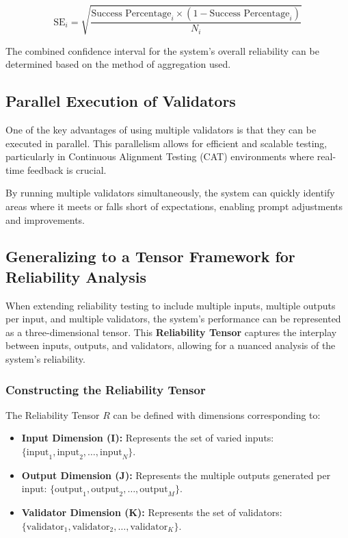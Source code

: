 \documentclass{article}
\begin{document}
\begin{equation*}
\text{SE}_i = \sqrt{\frac{\text{Success Percentage}_i \times (1 - \text{Success Percentage}_i)}{N_i}}
\end{equation*}

The combined confidence interval for the system’s overall reliability can be determined based on the method of aggregation used.

\subsection{Parallel Execution of Validators}

One of the key advantages of using multiple validators is that they can be executed in parallel. This parallelism allows for efficient and scalable testing, particularly in Continuous Alignment Testing (CAT) environments where real-time feedback is crucial.

By running multiple validators simultaneously, the system can quickly identify areas where it meets or falls short of expectations, enabling prompt adjustments and improvements.

\subsection{Generalizing to a Tensor Framework for Reliability Analysis}

When extending reliability testing to include multiple inputs, multiple outputs per input, and multiple validators, the system's performance can be represented as a three-dimensional tensor. This \textbf{Reliability Tensor} captures the interplay between inputs, outputs, and validators, allowing for a nuanced analysis of the system's reliability.

\subsubsection{Constructing the Reliability Tensor}

The Reliability Tensor \( R \) can be defined with dimensions corresponding to:

\begin{itemize}
    \item \textbf{Input Dimension (I):} Represents the set of varied inputs:\newline \( \{\text{input}_1, \text{input}_2, \ldots, \text{input}_N\} \).
    \item \textbf{Output Dimension (J):} Represents the multiple outputs generated per input: \( \{\text{output}_1, \text{output}_2, \ldots, \text{output}_M\} \).
    \item \textbf{Validator Dimension (K):} Represents the set of validators:\newline \( \{\text{validator}_1, \text{validator}_2, \ldots, \text{validator}_K\} \).
\end{itemize}
\end{document}
